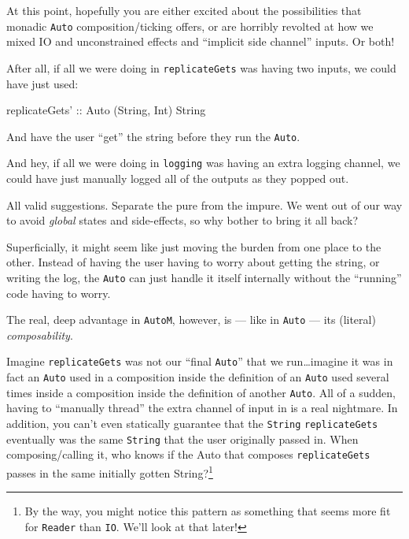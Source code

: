 \documentclass[]{article}
\newenvironment{Shaded}{}{}
\newcommand{\DataTypeTok}[1]{\textcolor[rgb]{0.56,0.13,0.00}{{#1}}}
\newcommand{\OtherTok}[1]{\textcolor[rgb]{0.00,0.44,0.13}{{#1}}}
\newcommand{\NormalTok}[1]{{#1}}
\begin{document}
At this point, hopefully you are either excited about the possibilities
that monadic \texttt{Auto} composition/ticking offers, or are horribly
revolted at how we mixed IO and unconstrained effects and ``implicit
side channel'' inputs. Or both!

After all, if all we were doing in \texttt{replicateGets} was having two
inputs, we could have just used:

\begin{Shaded}
\begin{Highlighting}[]
\OtherTok{replicateGets' ::} \DataTypeTok{Auto} \NormalTok{(}\DataTypeTok{String}\NormalTok{, }\DataTypeTok{Int}\NormalTok{) }\DataTypeTok{String}
\end{Highlighting}
\end{Shaded}

And have the user ``get'' the string before they run the \texttt{Auto}.

And hey, if all we were doing in \texttt{logging} was having an extra
logging channel, we could have just manually logged all of the outputs
as they popped out.

All valid suggestions. Separate the pure from the impure. We went out of
our way to avoid \emph{global} states and side-effects, so why bother to
bring it all back?

Superficially, it might seem like just moving the burden from one place
to the other. Instead of having the user having to worry about getting
the string, or writing the log, the \texttt{Auto} can just handle it
itself internally without the ``running'' code having to worry.

The real, deep advantage in \texttt{AutoM}, however, is --- like in
\texttt{Auto} --- its (literal) \emph{composability}.

Imagine \texttt{replicateGets\textquotesingle{}} was not our ``final
\texttt{Auto}'' that we run\ldots{}imagine it was in fact an
\texttt{Auto} used in a composition inside the definition of an
\texttt{Auto} used several times inside a composition inside the
definition of another \texttt{Auto}. All of a sudden, having to
``manually thread'' the extra channel of input in is a real nightmare.
In addition, you can't even statically guarantee that the
\texttt{String} \texttt{replicateGets} eventually was the same
\texttt{String} that the user originally passed in. When
composing/calling it, who knows if the Auto that composes
\texttt{replicateGets\textquotesingle{}} passes in the same initially
gotten String?\footnote{By the way, you might notice this pattern as
  something that seems more fit for \texttt{Reader} than \texttt{IO}.
  We'll look at that later!}
\end{document}

